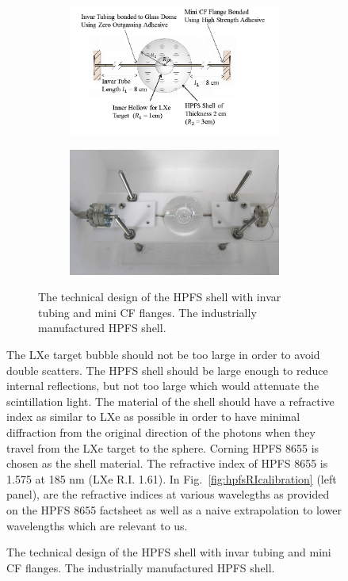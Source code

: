 \begin{figure}[h]
\begin{figure}[h]
\centering
\begin{subfigure}[c]{0.4\textheight}
\includegraphics[width=\textwidth]{spheredesign1.png}
\end{subfigure}
\begin{subfigure}[c]{0.25\textheight}
\includegraphics[width=\textwidth]{spherephoto.png}
\end{subfigure}
\caption{ The technical design of the HPFS shell with invar tubing and mini CF flanges. 
 The industrially manufactured HPFS shell.} 
\label{fig:sphere}
\end{figure}



The LXe target bubble should not be too large in order to avoid double scatters. 
The HPFS shell should be large enough to reduce internal reflections, but not 
too large which would attenuate the scintillation light. The material of the 
shell should have a refractive index as similar to LXe as possible in order to 
have minimal diffraction from the original direction of the photons when they 
travel from the LXe target to the sphere. Corning HPFS 8655 is chosen as the shell 
material. The refractive index of HPFS 8655 is 1.575 at 185 nm (LXe R.I. 1.61). 
In Fig.~\ref{fig:hpfsRIcalibration} (left panel), are the refractive indices at various wavelegths 
as provided on the HPFS 8655 factsheet as well as a naive extrapolation to lower wavelengths 
which are relevant to us. 


\end{figure}
